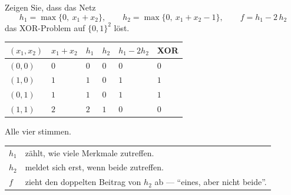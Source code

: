 \begin{aufgabe}
Zeigen Sie, dass das Netz
\[ h_1 = \max\{0,\ x_1+x_2\}, \qquad h_2 = \max\{0,\ x_1+x_2-1\}, \qquad f = h_1 - 2\,h_2 \]
das XOR-Problem auf $\{0,1\}^{2}$ löst.

\loesung
{}
\begin{center}
{\small
\renewcommand{\arraystretch}{1.5}
\begin{tabular}{@{}P{1.4cm}P{1.6cm}P{1.2cm}P{1.2cm}P{2.0cm}P{1.2cm}@{}}
\toprule
$(x_1,x_2)$ & $x_1+x_2$ & $h_1$ & $h_2$ & $h_1-2h_2$ & \textbf{XOR}\\
\midrule
$(0,0)$ & $0$ & $0$ & $0$ & $0$ & $0$\\
$(1,0)$ & $1$ & $1$ & $0$ & $1$ & $1$\\
$(0,1)$ & $1$ & $1$ & $0$ & $1$ & $1$\\
$(1,1)$ & $2$ & $2$ & $1$ & $0$ & $0$\\
\bottomrule
\end{tabular}}
\end{center}

Alle vier stimmen. \checkmark

\begin{center}
{\small
\renewcommand{\arraystretch}{1.5}
\begin{tabular}{@{}P{1.6cm}P{6.8cm}@{}}
\toprule
$h_1$ & zählt, wie viele Merkmale zutreffen.\\
$h_2$ & meldet sich erst, wenn beide zutreffen.\\
$f$ & zieht den doppelten Beitrag von $h_2$ ab --- \enquote{eines, aber nicht beide}.\\
\bottomrule
\end{tabular}}
\end{center}

\begin{center}
\begin{minipage}{0.88\textwidth}
\end{minipage}
\end{center}
\end{aufgabe}

